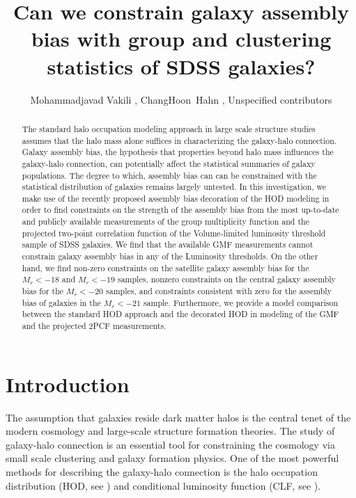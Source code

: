 \documentclass[12pt, preprint]{emulateapj}
\begin{document}
\title{Can we constrain galaxy assembly bias with group and clustering statistics of SDSS galaxies?}
\author{Mohammadjavad Vakili  , ChangHoon~Hahn , Unspecified contributors }
\begin{abstract}

The standard halo occupation modeling approach in large scale structure 
studies assumes that the halo mass alone suffices in characterizing the 
galaxy-halo connection. Galaxy assembly bias, the hypothesis that properties beyond 
halo mass influences the galaxy-halo connection, can potentially affect the 
statistical summaries of galaxy populations. The degree to which, assembly bias can 
can be constrained with the statistical distribution of galaxies remains largely 
untested. In this investigation, we make use of the recently proposed assembly bias decoration 
of the HOD modeling in order to find constraints on the strength of the assembly bias from the most up-to-date and publicly available measurements of the group multiplicity function and the projected two-point correlation function of the Volume-limited luminosity threshold sample of SDSS 
galaxies. We find that the available GMF measurements cannot constrain galaxy assembly bias in any of the Luminosity thresholds. On the other hand, we find non-zero constraints on the satellite galaxy assembly bias for the $M_{r}<-18$ and $M_{r}<-19$ samples, nonzero constraints on the central galaxy assembly bias for the $M_{r}<-20$ samples, and constraints consistent with zero for the assembly bias of galaxies in the $M_{r}<-21$ sample. Furthermore, we provide a model comparison between the standard HOD approach and the decorated HOD in modeling of the GMF and the projected 2PCF measurements.

\end{abstract}

\section{Introduction}
The assumption that galaxies reside dark matter halos 
is the central tenet of the modern cosmology and 
large-scale structure formation theories. The study of galaxy-halo connection is an essential tool for constraining the cosmology via small scale clustering and galaxy formation physics. One of the most powerful methods for describing the galaxy-halo connection is the halo occupation distribution (HOD, see \citealt{seljak2000, berlind_weinberg2002, scoccimarro2001, zheng2005, zheng2007}) and conditional luminosity function (CLF, see \citealt{clf_vdBosch}).
\end{document}
